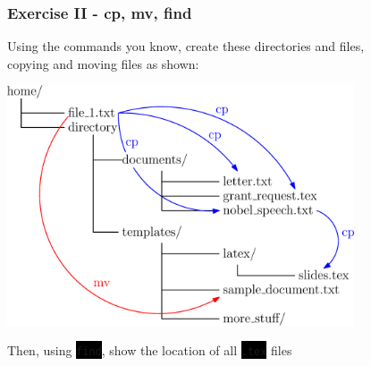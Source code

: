 \documentclass[unknownkeysallowed, 10pt, a4 paper, handout]{beamer}
\newcommand{\code}[1]{\colorbox{black}{\color{green}\texttt{#1}}}
\begin{document}
\begin{frame}
  \begin{center}
    \frametitle{Exercise II - cp, mv, find}
    Using the commands you know, create these directories and files,\\
    copying and moving files as shown:

    \begin{center}
      \includegraphics[width=0.77\textwidth]{pics/ex_2.eps}
    \end{center}

    Then, using \code{find}, show the location of all \code{.tex} files
  \end{center}
\end{frame}
\end{document}
